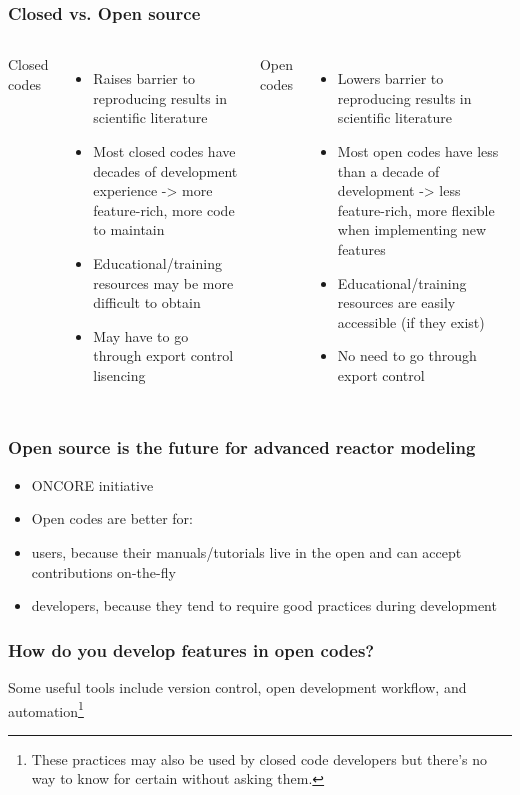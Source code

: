 \begin{frame}
    \frametitle{Closed vs. Open source}
    \begin{columns}
        \column[t]{5cm}
        Closed codes
        \begin{itemize}
            \item Raises barrier to reproducing results in scientific literature
            \item Most closed codes have decades of development experience -> more feature-rich, more code to maintain
            \item Educational/training resources may be more difficult to obtain
            \item May have to go through export control lisencing
        \end{itemize}


        \column[t]{5cm}
        Open codes
        \begin{itemize}
            \item Lowers barrier to reproducing results in scientific literature
            \item Most open codes have less than a decade of development -> less feature-rich, more flexible when implementing new features
            \item Educational/training resources are easily accessible (if they exist)
            \item No need to go through export control
        \end{itemize}
    \end{columns}

    \end{frame}

\begin{frame}
    \frametitle{Open source is the future for advanced reactor modeling}
    \begin{itemize}
        \item \Gls{ONCORE} initiative
        \item Open codes are better for:
        \item users, because their manuals/tutorials live in the open and can accept contributions on-the-fly
        \item developers, because they tend to require good practices during development 
    \end{itemize}
\end{frame}

\begin{frame}[t]
    \frametitle{How do you develop features in open codes?}
    Some useful tools include version control, open development workflow, and automation\footnote{These practices may also be used by closed code developers but there's no way to know for certain without asking them.}
    
\end{frame}
